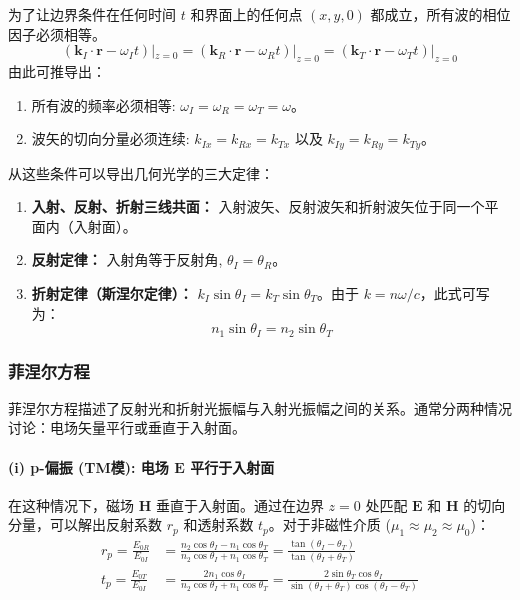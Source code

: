 \documentclass[fontset=none]{ctexart}
\begin{document}
\begin{theorem}[反射和折射定律]
为了让边界条件在任何时间 $t$ 和界面上的任何点 $(x,y,0)$ 都成立，所有波的相位因子必须相等。
\begin{equation}
(\bm{k}_I \cdot \bm{r} - \omega_I t)|_{z=0} = (\bm{k}_R \cdot \bm{r} - \omega_R t)|_{z=0} = (\bm{k}_T \cdot \bm{r} - \omega_T t)|_{z=0}
\end{equation}
由此可推导出：
\begin{enumerate}
    \item 所有波的频率必须相等: $\omega_I = \omega_R = \omega_T = \omega$。
    \item 波矢的切向分量必须连续: $k_{Ix} = k_{Rx} = k_{Tx}$ 以及 $k_{Iy} = k_{Ry} = k_{Ty}$。
\end{enumerate}
从这些条件可以导出几何光学的三大定律：
\begin{enumerate}
    \item \textbf{入射、反射、折射三线共面：} 入射波矢、反射波矢和折射波矢位于同一个平面内（入射面）。
    \item \textbf{反射定律：} 入射角等于反射角, $\theta_I = \theta_R$。
    \item \textbf{折射定律（斯涅尔定律）：} $k_I \sin\theta_I = k_T \sin\theta_T$。由于 $k=n\omega/c$，此式可写为：
    \begin{equation}
    n_1 \sin\theta_I = n_2 \sin\theta_T
    \end{equation}
\end{enumerate}
\end{theorem}

\subsubsection{菲涅尔方程}
菲涅尔方程描述了反射光和折射光振幅与入射光振幅之间的关系。通常分两种情况讨论：电场矢量平行或垂直于入射面。

\paragraph{(i) p-偏振 (TM模): 电场 $\bm{E}$ 平行于入射面}
在这种情况下，磁场 $\bm{H}$ 垂直于入射面。通过在边界 $z=0$ 处匹配 $\bm{E}$ 和 $\bm{H}$ 的切向分量，可以解出反射系数 $r_p$ 和透射系数 $t_p$。对于非磁性介质 ($\mu_1 \approx \mu_2 \approx \mu_0$)：
\begin{align}
r_p = \frac{E_{0R}}{E_{0I}} &= \frac{n_2 \cos\theta_I - n_1 \cos\theta_T}{n_2 \cos\theta_I + n_1 \cos\theta_T} = \frac{\tan(\theta_I - \theta_T)}{\tan(\theta_I + \theta_T)} \\
t_p = \frac{E_{0T}}{E_{0I}} &= \frac{2 n_1 \cos\theta_I}{n_2 \cos\theta_I + n_1 \cos\theta_T} = \frac{2 \sin\theta_T \cos\theta_I}{\sin(\theta_I + \theta_T)\cos(\theta_I - \theta_T)}
\end{align}
\end{document}
